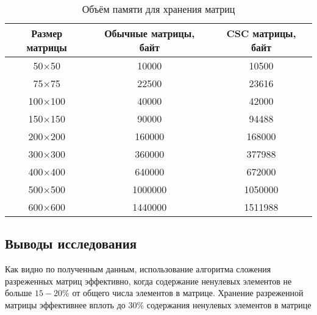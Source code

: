 \begin{table}[H]
	\centering
	\caption{Объём памяти для хранения матриц}
	\begin{tabular}{|c|c|c|}
		\hline
		Размер матрицы & Обычные матрицы, байт & CSC матрицы, байт \\ \hline
		50$\times$50         & 10000                 & 10500             \\ \hline
		75$\times$75         & 22500                 & 23616             \\ \hline
		100$\times$100        & 40000                 & 42000	             \\ \hline
		150$\times$150        & 90000                 & 94488            \\ \hline
		200$\times$200        & 160000                & 168000            \\ \hline
		300$\times$300        & 360000                & 377988            \\ \hline
		400$\times$400        & 640000                & 672000           \\ \hline
		500$\times$500        & 1000000               & 1050000           \\ \hline
		600$\times$600        & 1440000               & 1511988           \\ \hline
	\end{tabular}
\end{table}

\subsection{Выводы исследования}
Как видно по полученным данным, использование алгоритма сложения разреженных матриц эффективно, когда содержание ненулевых элементов не больше $15-20\%$ от общего числа элементов в матрице. 
Хранение разреженной матрицы эффективнее вплоть до $30\%$ содержания ненулевых элементов в матрице
